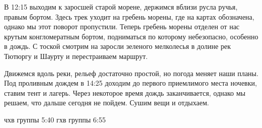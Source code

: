 В 12:15  выходим к заросшей старой морене, держимся вблизи русла ручья, правым бортом. Здесь трек уходит на гребень морены, где на картах обозначена, однако мы этот поворот пропустили. Теперь гребень морены отделен от нас крутым конгломератным бортом, подниматься по которому небезопасно, особенно в дождь. С тоской смотрим на заросли зеленого мелколесья в долине рек Тютюргу и Шаурту и перестраиваем маршрут.

Движемся вдоль реки, рельеф достаточно простой, но погода меняет наши планы. Под проливным дождем в 14:25 доходим до первого приемлимого места ночевки, ставим тент и лагерь. Через некоторое время дождь заканчивается, однако мы решаем, что дальше сегодня не пойдем. Сушим вещи и отдыхаем.









чхв группы  5:40
гхв группы  6:55



    \FloatBarrier

